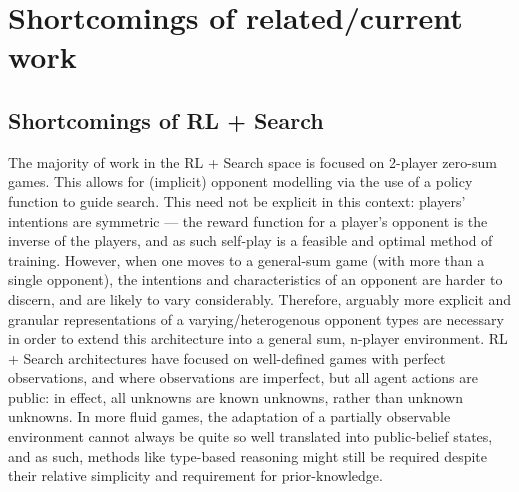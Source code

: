 \section{Shortcomings of related/current work}
\subsection{Shortcomings of RL + Search}
The majority of work in the RL + Search space is focused on 2-player zero-sum games. 
This allows for (implicit) opponent modelling via the use of a policy function to guide search. This need not be explicit in this context: players' intentions are symmetric --- the reward function for a player's opponent is the inverse of the players, and as such self-play is a feasible and optimal method of training. 
However, when one moves to a general-sum game (with more than a single opponent), the intentions and characteristics of an opponent are harder to discern, and are likely to vary considerably. Therefore, arguably more explicit and granular representations of a varying/heterogenous opponent types are necessary in order to extend this architecture into a general sum, n-player environment.
\newline \newline
RL + Search architectures have focused on well-defined games with perfect observations, and where observations are imperfect, but all agent actions are public: in effect, all unknowns are known unknowns, rather than unknown unknowns. In more fluid games, the adaptation of a partially observable environment cannot always be quite so well translated into public-belief states, and as such, methods like type-based reasoning might still be required despite their relative simplicity and requirement for prior-knowledge.
